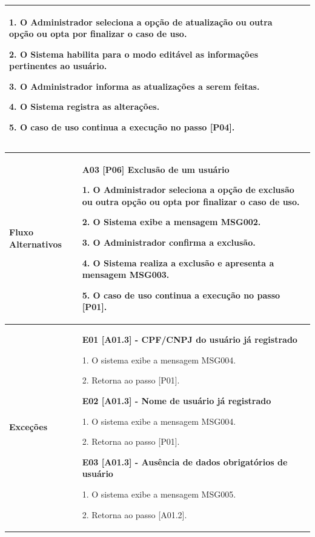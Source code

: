 \begin{quadro}[!htbp]
\begin{tabular}{  m{4cm}  m{11cm} }
        1. O Administrador seleciona a opção de atualização ou outra opção ou opta por finalizar o caso de uso.
        
        2. O Sistema habilita para o modo editável as informações pertinentes ao usuário.
        
        3. O Administrador informa as atualizações a serem feitas.
        
        4. O Sistema registra as alterações.
        
        5. O caso de uso continua a execução no passo [P04].  \\ \hline
	\end{tabular}
\end{quadro}

\newpage

\begin{quadro}[!htbp]
	\begin{tabular}{  m{4cm}  m{11cm} }
        \textbf {Fluxo  Alternativos}  & \textbf {A03 [P06] Exclusão de um usuário}
        
        1. O Administrador seleciona a opção de exclusão ou outra opção ou opta por finalizar o caso de uso.
        
        2. O Sistema exibe a mensagem MSG002.
        
        3. O Administrador confirma a exclusão.
        
        4. O Sistema realiza a exclusão e apresenta a mensagem MSG003.
        
        5. O caso de uso continua a execução no passo [P01].  \\ \hline
	
        \cellcolor{gray!10} \textbf {Exceções}            & \cellcolor{gray!10} \textbf {E01 [A01.3] - CPF/CNPJ do usuário já registrado}
        
        1. O sistema exibe a mensagem MSG004.
        
        2. Retorna ao passo [P01].
        
        \textbf {E02 [A01.3] - Nome de usuário já registrado}
        
        1. O sistema exibe a mensagem MSG004.
        
        2. Retorna ao passo [P01].
        
        \textbf {E03 [A01.3] - Ausência de dados obrigatórios de usuário}
        
        1. O sistema exibe a mensagem MSG005.
        
        2. Retorna ao passo [A01.2].
        

\end{tabular}
\end{quadro}
